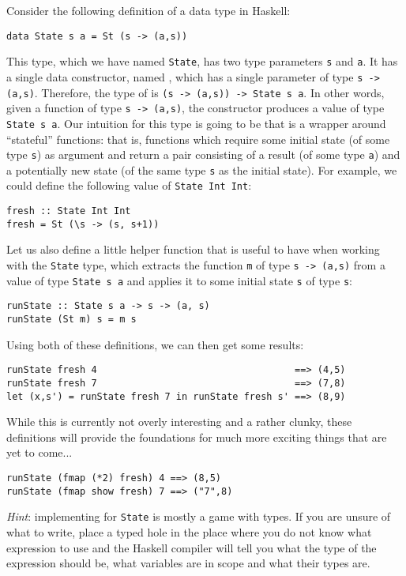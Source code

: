 \taskLine \pagebreak

Consider the following definition of a data type in Haskell:
\begin{verbatim}
data State s a = St (s -> (a,s))
\end{verbatim}
This type, which we have named \texttt{\small State}, has two type parameters \texttt{\small s} and \texttt{\small a}. It has a single data constructor, named , which has a single parameter of type \texttt{\small s -> (a,s)}. Therefore, the type of  is \texttt{\small (s -> (a,s)) -> State s a}. In other words, given a function of type \texttt{\small s -> (a,s)}, the  constructor produces a value of type \texttt{\small State s a}. Our intuition for this type is going to be that  is a wrapper around ``stateful'' functions: that is, functions which require some initial state (of some type \texttt{\small s}) as argument and return a pair consisting of a result (of some type \texttt{\small a}) and a potentially new state (of the same type \texttt{\small s} as the initial state). For example, we could define the following value of \texttt{\small State Int Int}:
\begin{verbatim}
fresh :: State Int Int 
fresh = St (\s -> (s, s+1))
\end{verbatim}
Let us also define a little helper function that is useful to have when working with the \texttt{\small State} type, which extracts the function \texttt{\small m} of type \texttt{\small s -> (a,s)} from a value of type \texttt{\small State s a} and applies it to some initial state \texttt{\small s} of type \texttt{\small s}:
\begin{verbatim}
runState :: State s a -> s -> (a, s)
runState (St m) s = m s
\end{verbatim}
Using both of these definitions, we can then get some results:
\begin{verbatim}
runState fresh 4                                   ==> (4,5)
runState fresh 7                                   ==> (7,8)
let (x,s') = runState fresh 7 in runState fresh s' ==> (8,9)
\end{verbatim}
While this is currently not overly interesting and a rather clunky, these definitions will provide the foundations for much more exciting things that are yet to come...

\begin{verbatim}
runState (fmap (*2) fresh) 4 ==> (8,5) 
runState (fmap show fresh) 7 ==> ("7",8)
\end{verbatim}
\emph{Hint}: implementing  for \texttt{\small State} is mostly a game with types. If you are unsure of what to write, place a typed hole \haskellIn{_} in the place where you do not know what expression to use and the Haskell compiler will tell you what the type of the expression should be, what variables are in scope and what their types are.

